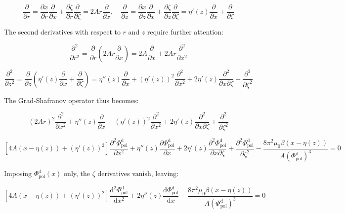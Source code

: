 \begin{equation}
    \frac{\partial}{\partial r}=\frac{\partial x}{\partial r}\frac{\partial}{\partial x}+\frac{\partial\zeta}{\partial r}\frac{\partial}{\partial\zeta}=2Ar\frac{\partial}{\partial x},\quad\frac{\partial}{\partial z}=\frac{\partial x}{\partial z}\frac{\partial}{\partial x}+\frac{\partial\zeta}{\partial z}\frac{\partial}{\partial\zeta}=\eta'(z)\frac{\partial}{\partial x}+\frac{\partial}{\partial\zeta}
\end{equation}

The second derivatives with respect to $r$ and $z$ require further attention:

\begin{equation}
    \frac{\partial^2}{\partial r^2}=\frac{\partial}{\partial r}\left(2Ar\frac{\partial}{\partial x}\right)=2A\frac{\partial}{\partial x}+2Ar\frac{\partial^2}{\partial x^2}
\end{equation}

\begin{equation}
    \frac{\partial^2}{\partial z^2}=\frac{\partial}{\partial z}\left(\eta'(z)\frac{\partial}{\partial x}+\frac{\partial}{\partial\zeta}\right)=\eta''(z)\frac{\partial}{\partial x}+(\eta'(z))^2\frac{\partial^2}{\partial x^2}+2\eta'(z)\frac{\partial^2}{\partial x\partial\zeta}+\frac{\partial^2}{\partial\zeta^2}
\end{equation}

The Grad-Shafranov operator thus becomes:

\begin{equation}
    (2Ar)^2\frac{\partial^2}{\partial x^2}+\eta''(z)\frac{\partial}{\partial x}+(\eta'(z))^2\frac{\partial^2}{\partial x^2}+2\eta'(z)\frac{\partial^2}{\partial x\partial\zeta}+\frac{\partial^2}{\partial\zeta^2}
\end{equation}

\begin{equation}
    \left[4A(x-\eta(z))+(\eta'(z))^2\right]\frac{\partial^2\Phi_\text{pol}^\mathrm{d}}{\partial x^2}+\eta''(z)\frac{\partial\Phi_\text{pol}^\mathrm{d}}{\partial x}+2\eta'(z)\frac{\partial^2\Phi_\text{pol}^\mathrm{d}}{\partial x\partial\zeta}+\frac{\partial^2\Phi_\text{pol}^\mathrm{d}}{\partial\zeta^2}-\frac{8\pi^2\mu_0\beta(x-\eta(z))}{A(\Phi_\text{pol}^\mathrm{d})^3}=0
\end{equation}

Imposing $\Phi_\text{pol}^\mathrm{d}(x)$ only, the $\zeta$ derivatives vanish, leaving:

\begin{equation}
    \left[4A(x-\eta(z))+(\eta'(z))^2\right]\frac{\mathrm{d}^2\Phi_\text{pol}^\mathrm{d}}{\mathrm{d}x^2}+2\eta''(z)\frac{\mathrm{d}\Phi_\text{pol}^\mathrm{d}}{\mathrm{d}x}-\frac{8\pi^2\mu_0\beta(x-\eta(z))}{A(\Phi_\text{pol}^\mathrm{d})^3}=0
\end{equation}

